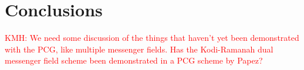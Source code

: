 \documentclass[twocolumn,linenumbers]{aastex631}
\newcommand{\vbd}{\vb{d}}
\newcommand{\vbm}{\vb{m}}
\newcommand{\vbb}{\vb{b}}
\newcommand{\inv}[1]{#1^{-1}}
\newcommand{\hatm}{\vb{\hat{m}}}
\newcommand{\Pdagger}{P^{\dagger}}
\newcommand{\Nbar}{\bar{N}}
\newcommand{\PPinv}[1]{\inv{\qty(\Pdagger #1 P)}}
\newcommand{\kmh}[1]{\textcolor{red}{KMH: #1}}
\begin{document}

\section{Conclusions} \label{sec:conclusions} 

\kmh{We need some discussion of the things that haven't yet been demonstrated with the PCG, like multiple messenger fields.  Has the Kodi-Ramanah dual messenger field scheme been demonstrated in a PCG scheme by Papez?}

%



%
\end{document}
